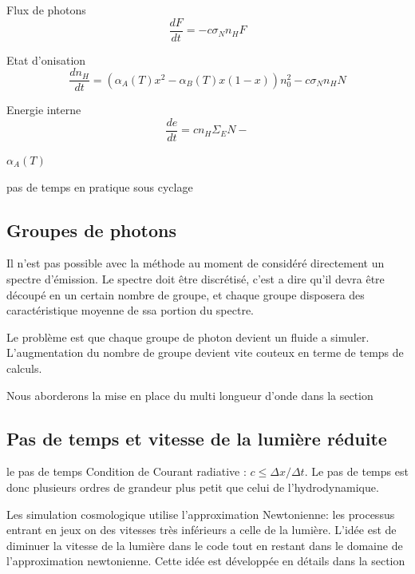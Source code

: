 Flux de photons
\begin{equation}
\frac{dF}{dt} = - c \sigma_N n_H F
\end{equation}

Etat d'onisation
\begin{equation}
\frac{dn_H}{dt} =  \left( \alpha_A(T)x^2  - \alpha_B(T)x (1-x) \right) n_0^2 - c \sigma_N n_HN
\end{equation}


Energie interne
\begin{equation}
\frac{de}{dt} = c n_H \Sigma_E N - 
\end{equation}

$\alpha_A(T)$


pas de temps
en pratique sous cyclage

\subsection{Groupes de photons}
\label{sec:groupedephotons}

Il n'est pas possible avec la méthode au moment de considéré directement un spectre d'émission.
Le spectre doit être discrétisé, c'est a dire qu'il devra être découpé en un certain nombre de groupe, et chaque groupe disposera des caractéristique moyenne de ssa portion du spectre.

Le problème est que chaque groupe de photon devient un fluide a simuler. 
L'augmentation du nombre de groupe devient vite couteux en terme de temps de calculs.


Nous aborderons la mise en place du multi longueur d'onde dans la section %

\subsection{Pas de temps et vitesse de la lumière réduite}
le pas de temps
Condition de Courant radiative : $ c \leq \Delta x / \Delta t $.
Le pas de temps est donc plusieurs ordres de grandeur plus petit que celui de l'hydrodynamique.


Les simulation cosmologique utilise l'approximation Newtonienne: les processus entrant en jeux on des vitesses très inférieurs a celle de la lumière.
L'idée est de diminuer la vitesse de la lumière dans le code tout en restant dans le domaine de l'approximation newtonienne.
Cette idée est développée en détails dans la section %


